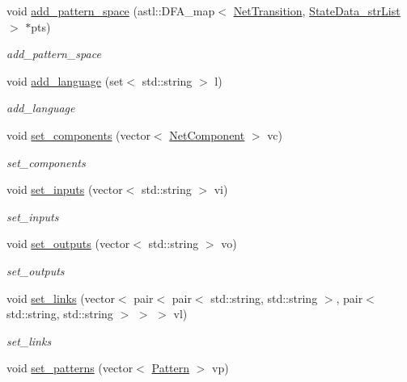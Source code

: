 \begin{DoxyCompactItemize}
void \hyperlink{class_network_model_a3eb4abcd7feb1c3679fc774c217e28a8}{add\+\_\+pattern\+\_\+space} (astl\+::\+D\+F\+A\+\_\+map$<$ \hyperlink{class_net_transition}{Net\+Transition}, \hyperlink{class_state_data__str_list}{State\+Data\+\_\+str\+List} $>$ $\ast$pts)
\begin{DoxyCompactList}\small\item\em add\+\_\+pattern\+\_\+space \end{DoxyCompactList}\item 
void \hyperlink{class_network_model_a019437545f5aeb663e72bc228c287e29}{add\+\_\+language} (set$<$ std\+::string $>$ l)
\begin{DoxyCompactList}\small\item\em add\+\_\+language \end{DoxyCompactList}\item 
void \hyperlink{class_network_model_a8f6e2ed529313d9e88fe8e2069a748f7}{set\+\_\+components} (vector$<$ \hyperlink{class_net_component}{Net\+Component} $>$ vc)
\begin{DoxyCompactList}\small\item\em set\+\_\+components \end{DoxyCompactList}\item 
void \hyperlink{class_network_model_a971e36a67cebd56453a72692f4be7f6e}{set\+\_\+inputs} (vector$<$ std\+::string $>$ vi)
\begin{DoxyCompactList}\small\item\em set\+\_\+inputs \end{DoxyCompactList}\item 
void \hyperlink{class_network_model_a91d15b0367a25661db90c51adaec4302}{set\+\_\+outputs} (vector$<$ std\+::string $>$ vo)
\begin{DoxyCompactList}\small\item\em set\+\_\+outputs \end{DoxyCompactList}\item 
void \hyperlink{class_network_model_a0669f9fc1a612585a6e1977666928557}{set\+\_\+links} (vector$<$ pair$<$ pair$<$ std\+::string, std\+::string $>$, pair$<$ std\+::string, std\+::string $>$ $>$ $>$ vl)
\begin{DoxyCompactList}\small\item\em set\+\_\+links \end{DoxyCompactList}\item 
void \hyperlink{class_network_model_a8efd039e281fc53492661b3f595c2c8c}{set\+\_\+patterns} (vector$<$ \hyperlink{class_pattern}{Pattern} $>$ vp)

\end{DoxyCompactItemize}
